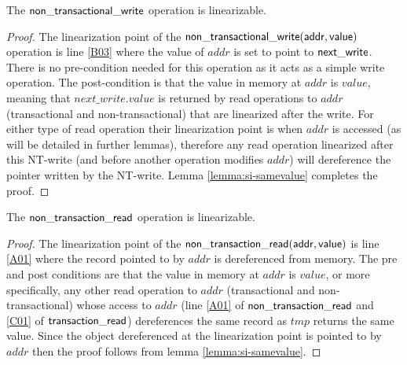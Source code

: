 \begin{lemma}
\label{lemma:si-ntwrite}
The $\sf{non\_transactional\_write}$ operation is linearizable.
\end{lemma}
\begin{proof}
The linearization point of the $\sf{non\_transactional\_write}(addr,value)$ operation
is line \ref{B03} where the value of $\mathit{addr}$ is set to point to $\sf{next\_write}$.
There is no pre-condition needed for this operation as it acts as a simple write operation.
The post-condition is that the value in memory at $\mathit{addr}$ is $\mathit{value}$, meaning that $\mathit{next\_write.value}$ is returned by 
read operations to $\mathit{addr}$ (transactional and non-transactional) that are linearized after the write.
For either type of read operation their linearization point is when $\mathit{addr}$ is accessed (as will be detailed in further lemmas),
therefore any read operation linearized after this NT-write (and before another operation modifies $\mathit{addr}$)
will dereference the pointer written by the NT-write.
Lemma \ref{lemma:si-samevalue} completes the proof.
\end{proof}


\begin{lemma}
\label{lemma:si-ntread}
The $\sf{non\_transaction\_read}$ operation is linearizable.
\end{lemma}
\begin{proof}
The linearization point of the $\sf{non\_transaction\_read}(addr, value)$ is line \ref{A01} where the record
pointed to by $\mathit{addr}$ is dereferenced from memory.
The pre and post conditions are that the value in memory at $\mathit{addr}$ is $\mathit{value}$, or more specifically, 
any other read operation to $\mathit{addr}$ (transactional and non-transactional) whose access to $\mathit{addr}$
(line \ref{A01} of $\sf{non\_transaction\_read}$ and \ref{C01} of $\sf{transaction\_read}$) dereferences
the same record as $\mathit{tmp}$ returns the same value.
Since the object dereferenced at the linearization point is pointed to by $\mathit{addr}$ then the proof follows from
lemma \ref{lemma:si-samevalue}.
\end{proof}



